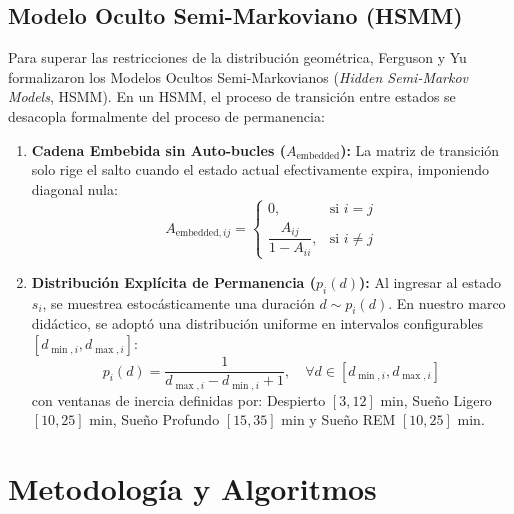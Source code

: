 \documentclass[11pt,a4paper]{article}
\begin{document}
\subsection{Modelo Oculto Semi-Markoviano (HSMM)}
Para superar las restricciones de la distribución geométrica, Ferguson \cite{ferguson1980} y Yu \cite{yu2010} formalizaron los Modelos Ocultos Semi-Markovianos (\textit{Hidden Semi-Markov Models}, HSMM). En un HSMM, el proceso de transición entre estados se desacopla formalmente del proceso de permanencia:
\begin{enumerate}[leftmargin=*,itemsep=1pt]
    \item \textbf{Cadena Embebida sin Auto-bucles ($A_{\text{embedded}}$):} La matriz de transición solo rige el salto cuando el estado actual efectivamente expira, imponiendo diagonal nula:
    \begin{equation}
        A_{\text{embedded}, ij} = \begin{cases} 0, & \text{si } i = j \\ \dfrac{A_{ij}}{1 - A_{ii}}, & \text{si } i \ne j \end{cases}
    \end{equation}
    \item \textbf{Distribución Explícita de Permanencia ($p_i(d)$):} Al ingresar al estado $s_i$, se muestrea estocásticamente una duración $d \sim p_i(d)$. En nuestro marco didáctico, se adoptó una distribución uniforme en intervalos configurables $[d_{\min, i}, d_{\max, i}]$:
    \begin{equation}
        p_i(d) = \frac{1}{d_{\max, i} - d_{\min, i} + 1}, \quad \forall d \in [d_{\min, i}, d_{\max, i}]
    \end{equation}
    con ventanas de inercia definidas por: Despierto $[3, 12]\text{ min}$, Sueño Ligero $[10, 25]\text{ min}$, Sueño Profundo $[15, 35]\text{ min}$ y Sueño REM $[10, 25]\text{ min}$.
\end{enumerate}

\section{Metodología y Algoritmos}
\end{document}
